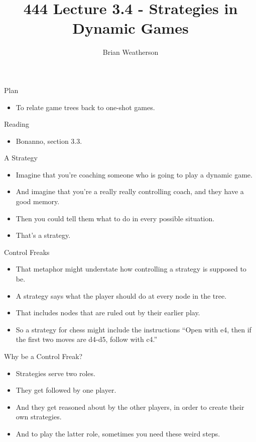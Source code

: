 \documentclass[
  ignorenonframetext,
]{beamer}
\title{444 Lecture 3.4 - Strategies in Dynamic Games}
\author{Brian Weatherson}
\date{}
\providecommand{\tightlist}{%
  \setlength{\itemsep}{0pt}\setlength{\parskip}{0pt}}
\begin{document}
\frame{\titlepage}

\begin{frame}{Plan}
\protect\hypertarget{plan}{}
\begin{itemize}
\tightlist
\item
  To relate game trees back to one-shot games.
\end{itemize}
\end{frame}

\begin{frame}{Reading}
\protect\hypertarget{reading}{}
\begin{itemize}
\tightlist
\item
  Bonanno, section 3.3.
\end{itemize}
\end{frame}

\begin{frame}{A Strategy}
\protect\hypertarget{a-strategy}{}
\begin{itemize}
\tightlist
\item
  Imagine that you're coaching someone who is going to play a dynamic
  game.
\item
  And imagine that you're a really really controlling coach, and they
  have a good memory.
\item
  Then you could tell them what to do in every possible situation.
\item
  That's a strategy.
\end{itemize}
\end{frame}

\begin{frame}{Control Freaks}
\protect\hypertarget{control-freaks}{}
\begin{itemize}
\tightlist
\item
  That metaphor might understate how controlling a strategy is supposed
  to be.
\item
  A strategy says what the player should do at every node in the tree.
\item
  That includes nodes that are ruled out by their earlier play.
\item
  So a strategy for chess might include the instructions ``Open with e4,
  then if the first two moves are d4-d5, follow with c4.''
\end{itemize}
\end{frame}

\begin{frame}{Why be a Control Freak?}
\protect\hypertarget{why-be-a-control-freak}{}
\begin{itemize}
\tightlist
\item
  Strategies serve two roles.
\item
  They get followed by one player.
\item
  And they get reasoned about by the other players, in order to create
  their own strategies.
\item
  And to play the latter role, sometimes you need these weird steps.
\end{itemize}
\end{frame}
\end{document}
